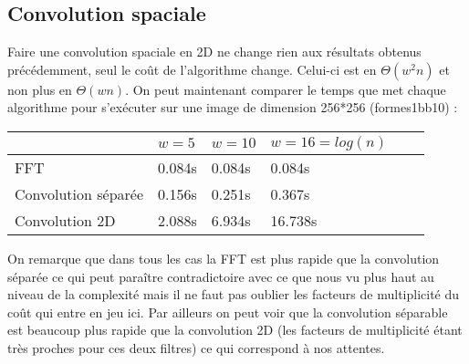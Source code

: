 \documentclass[12pt]{article}
\numberwithin{equation}{section}
\begin{document}
\subsection{Convolution spaciale}
Faire une convolution spaciale en 2D ne change rien aux résultats obtenus précédemment, seul le coût de l'algorithme change. Celui-ci est en $\Theta(w^2n)$ et non plus en $\Theta(wn)$. On peut maintenant comparer le temps que met chaque algorithme pour s'exécuter sur une image de dimension 256*256 (formes1bb10) :
\begin{center}
  \begin{tabular}{|l|l|l|l|l|l|}
    \hline
    & $w = 5$ & $w = 10$ & $w = 16 = log(n)$ \\
    \hline
    FFT & 0.084s & 0.084s & 0.084s\\
    \hline
    Convolution séparée &  0.156s &  0.251s & 0.367s\\
    \hline
    Convolution 2D & 2.088s & 6.934s & 16.738s \\
    \hline
  \end{tabular}
\end{center}

On remarque que dans tous les cas la FFT est plus rapide que la convolution séparée ce qui peut paraître contradictoire avec ce que nous vu plus haut au niveau de la complexité mais il ne faut pas oublier les facteurs de multiplicité du coût qui entre en jeu ici. Par ailleurs on peut voir que la convolution séparable est beaucoup plus rapide que la convolution 2D (les facteurs de multiplicité étant très proches pour ces deux filtres) ce qui correspond à nos attentes.
\end{document}
